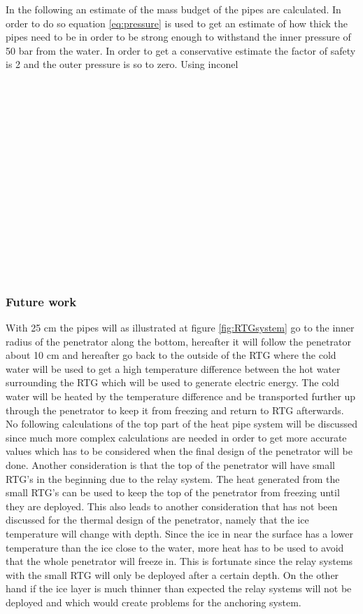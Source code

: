 \noindent 
In the following an estimate of the mass budget of the pipes are calculated. In order to do so equation \ref{eq:pressure} is used to get an estimate of how thick the pipes need to be in order to be strong enough to withstand the inner pressure of 50 bar from the water. In order to get a conservative estimate the factor of safety is 2 and the outer pressure is so to zero. Using inconel 
\\
\\
\\
\\
\\
\\
\\
\\
\\
\\
\\
\\
\\
\\
\\
\\

\subsubsection{Future work}
With 25 cm the pipes will as illustrated at figure \ref{fig:RTGsystem} go to the inner radius of the penetrator along the bottom, hereafter it will follow the penetrator about 10 cm and hereafter go back to the outside of the RTG where the cold water will be used to get a high temperature difference between the hot water surrounding the RTG which will be used to generate electric energy. The cold water will be heated by the temperature difference and be transported further up through the penetrator to keep it from freezing and return to RTG afterwards. No following calculations of the top part of the heat pipe system will be discussed since much more complex calculations are needed in order to get more accurate values which has to be considered when the final design of the penetrator will be done. Another consideration is that the top of the penetrator will have small RTG's in the beginning due to the relay system. The heat generated from the small RTG's can be used to keep the top of the penetrator from freezing until they are deployed. This also leads to another consideration that has not been discussed for the thermal design of the penetrator, namely that the ice temperature will change with depth. Since the ice in near the surface has a lower temperature than the ice close to the water, more heat has to be used to avoid that the whole penetrator will freeze in. This is fortunate since the relay systems with the small RTG will only be deployed after a certain depth. On the other hand if the ice layer is much thinner than expected the relay systems will not be deployed and which would create problems for the anchoring system.\\
 
